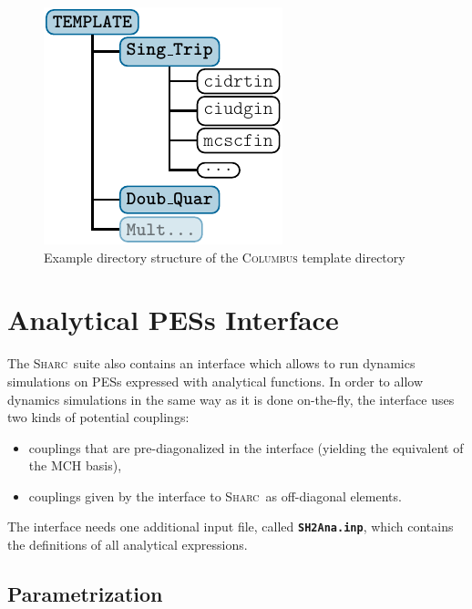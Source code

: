 \documentclass[a4paper,11pt,DIV=15,openany,twoside=false]{scrbook}
\newcommand{\sharc}{\textsc{Sharc}}
\newcommand{\ttt}[1]{\textbf{\texttt{#1}}}
\begin{document}
\begin{figure}[h!]
  \centering
  \includegraphics[scale=1]{img/dirs_COLtemp/dirs_COLtemp.pdf}
  \caption{Example directory structure of the \textsc{Columbus} template directory}
  \label{fig:dirs_COLtemp}
\end{figure}







\section{Analytical PESs Interface}\label{sec:int:analytical}

The \sharc\ suite also contains an interface which allows to run dynamics simulations on PESs expressed with analytical functions.
In order to allow dynamics simulations in the same way as it is done on-the-fly, the interface uses two kinds of potential couplings:
\begin{itemize}
  \item couplings that are pre-diagonalized in the interface (yielding the equivalent of the MCH basis),
  \item couplings given by the interface to \sharc\ as off-diagonal elements.
\end{itemize}

The interface needs one additional input file, called \ttt{SH2Ana.inp}, which contains the definitions of all analytical expressions.

\subsection{Parametrization}
\end{document}
